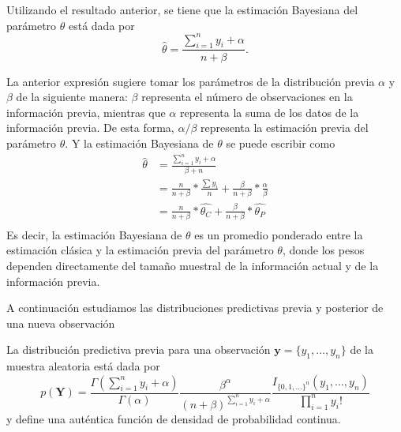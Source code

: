     Utilizando el resultado anterior, se tiene que la estimaci\'on Bayesiana del par\'ametro $\theta$ est\'a dada por
    \begin{equation*}
    \hat{\theta}=\frac{\sum_{i=1}^ny_i+\alpha}{n+\beta}.
    \end{equation*}
    
    La anterior expresi\'on sugiere tomar los par\'ametros de la distribuci\'on previa $\alpha$ y $\beta$ de la siguiente manera: $\beta$ representa el n\'umero de observaciones en la informaci\'on previa, mientras que $\alpha$ representa la suma de los datos de la informaci\'on previa. De esta forma, $\alpha/\beta$ representa la estimaci\'on previa del par\'ametro $\theta$. Y la estimaci\'on Bayesiana de $\theta$ se puede escribir como
    \begin{align*}
    \hat{\theta}&=\frac{\sum_{i=1}^ny_i+\alpha}{\beta+n}\\
    &=\frac{n}{n+\beta}*\frac{\sum y_i}{n}+\frac{\beta}{n+\beta}*\frac{\alpha}{\beta}\\
    &=\frac{n}{n+\beta}*\hat{\theta_C}+\frac{\beta}{n+\beta}*\hat{\theta_P}\\
    \end{align*}
    Es decir, la estimaci\'on Bayesiana de $\theta$ es un promedio ponderado entre la estimaci\'on cl\'asica y la estimaci\'on previa del par\'ametro $\theta$, donde los pesos dependen directamente del tama\~no muestral de la informaci\'on actual y de la informaci\'on previa. 
    
    A continuaci\'on estudiamos las distribuciones predictivas previa y posterior de una nueva observaci\'on 
    \begin{Res}
    La distribuci\'on predictiva previa para una observaci\'on $\mathbf{y}=\{y_1,\ldots,y_n\}$ de la muestra aleatoria est\'a dada por
    \begin{equation}\label{Pre_prior_Poisson}
    p(\mathbf{Y})=\frac{\Gamma(\sum_{i=1}^ny_i+\alpha)}{\Gamma(\alpha)}\frac{\beta^\alpha}{(n+\beta)^{\sum_{i=1}^ny_i+\alpha}}
    \frac{I_{\{0,1,\ldots\}^n}(y_1,\ldots,y_n)}{\prod_{i=1}^ny_i!}
    \end{equation}
    y define una aut\'entica funci\'on de densidad de probabilidad continua.
    \end{Res}
    
